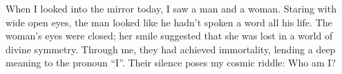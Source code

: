 \documentclass{article}
\begin{document}
\newline
When I looked into the mirror today, I saw a man and a woman. Staring
with wide open eyes, the man looked like he hadn't spoken a word all his
life. The woman's eyes were closed; her smile suggested that she was
lost in a world of divine symmetry. Through me, they had achieved
immortality, lending a deep meaning to the pronoun ``I''. 
\newline
Their silence poses my cosmic riddle: Who am I?
\end{document}
